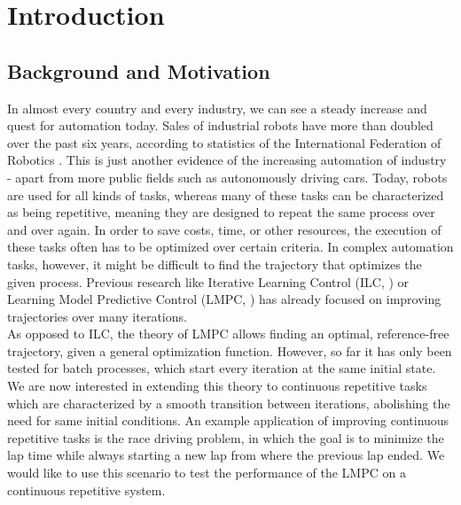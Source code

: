 \chapter{Introduction}
\section{Background and Motivation}
In almost every country and every industry, we can see a steady increase and quest for automation today. Sales of industrial robots have more than doubled over the past six years, according to statistics of the International Federation of Robotics \cite{IFR2016}. This is just another evidence of the increasing automation of industry - apart from more public fields such as autonomously driving cars. Today, robots are used for all kinds of tasks, whereas many of these tasks can be characterized as being repetitive, meaning they are designed to repeat the same process over and over again. In order to save costs, time, or other resources, the execution of these tasks often has to be optimized over certain criteria. In complex automation tasks, however, it might be difficult to find the trajectory that optimizes the given process. Previous research like Iterative Learning Control (ILC, \cite{Lee2007}) or Learning Model Predictive Control (LMPC, \cite{Rosolia2016}) has already focused on improving trajectories over many iterations.\\
As opposed to ILC, the theory of LMPC allows finding an optimal, reference-free trajectory, given a general optimization function. However, so far it has only been tested for batch processes, which start every iteration at the same initial state.\\
We are now interested in extending this theory to continuous repetitive tasks which are characterized by a smooth transition between iterations, abolishing the need for same initial conditions.
An example application of improving continuous repetitive tasks is the race driving problem, in which the goal is to minimize the lap time while always starting a new lap from where the previous lap ended. We would like to use this scenario to test the performance of the LMPC on a continuous repetitive system.

